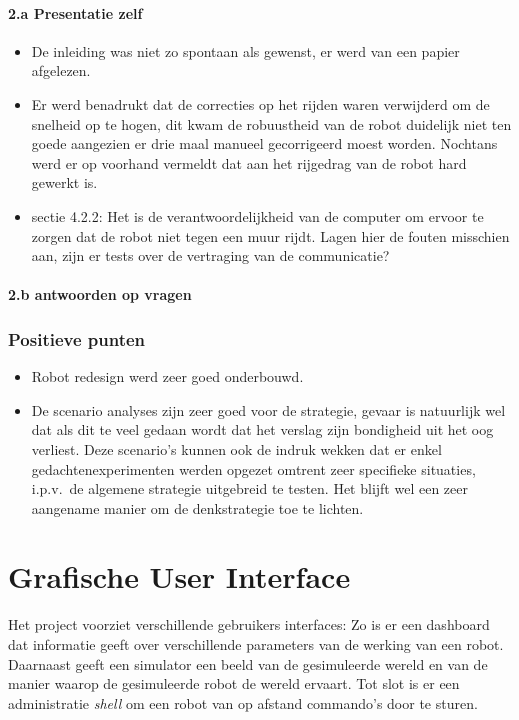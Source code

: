 \documentclass[12pt,a4paper]{report}
\begin{document}
	\subsubsection{2.a Presentatie zelf}
\begin{itemize}
	\item De inleiding was niet zo spontaan als gewenst, er werd van een papier afgelezen.
	\item Er werd benadrukt dat de correcties op het rijden waren verwijderd om de snelheid op te hogen, dit kwam de robuustheid van de robot duidelijk niet ten goede aangezien er drie maal manueel gecorrigeerd moest worden. Nochtans werd er op voorhand vermeldt dat aan het rijgedrag van de robot hard gewerkt is.
	\item sectie 4.2.2: Het is de verantwoordelijkheid van de computer om ervoor te zorgen dat de robot niet tegen een muur rijdt. Lagen hier de fouten misschien aan, zijn er tests over de vertraging van de communicatie?
\end{itemize}
     \subsubsection{2.b antwoorden op vragen}
\subsection{ Positieve punten}
\begin{itemize}
	\item Robot redesign werd zeer goed onderbouwd.
	\item De scenario analyses zijn zeer goed voor de strategie, gevaar is natuurlijk wel dat als dit te veel gedaan wordt dat het verslag zijn bondigheid uit het oog verliest. Deze scenario's kunnen ook de indruk wekken dat er enkel gedachtenexperimenten werden opgezet omtrent zeer specifieke situaties, i.p.v.\ de algemene strategie uitgebreid te testen. Het blijft wel een zeer aangename manier om de denkstrategie toe te lichten.
\end{itemize}
 
\chapter{Grafische User Interface}

Het project voorziet verschillende gebruikers interfaces: Zo is er een dashboard dat informatie geeft over verschillende parameters van de werking van een robot. Daarnaast geeft een simulator een beeld van de gesimuleerde wereld en van de manier waarop de gesimuleerde robot de wereld ervaart. Tot slot is er een administratie \emph{shell} om een robot van op afstand commando's door te sturen.
\end{document}
